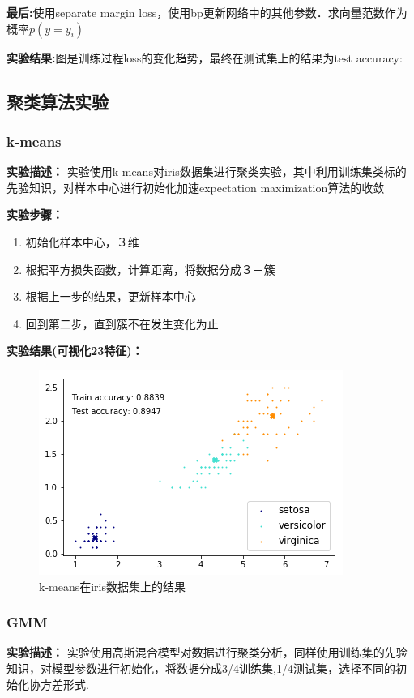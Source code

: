 \documentclass{article}
\begin{document}
\textbf{最后:}使用separate margin loss，使用bp更新网络中的其他参数．求向量范数作为概率$p(y=y_i)$

\textbf{实验结果:}图是训练过程loss的变化趋势，最终在测试集上的结果为test accuracy:

\subsection{聚类算法实验}
\subsubsection{k-means}
\textbf{实验描述：}
实验使用k-means对iris数据集进行聚类实验，其中利用训练集类标的先验知识，对样本中心进行初始化加速expectation maximization算法的收敛

\textbf{实验步骤：}
\begin{enumerate}
\item 初始化样本中心，３维
\item 根据平方损失函数，计算距离，将数据分成３－簇
\item 根据上一步的结果，更新样本中心
\item 回到第二步，直到簇不在发生变化为止 
\end{enumerate}

\textbf{实验结果(可视化23特征)：}
\begin{figure}[htb]
	\centering\includegraphics[scale=1.1]{knn_iris}
	\caption{k-means在iris数据集上的结果}
\end{figure}
\subsubsection{GMM}
\textbf{实验描述：}
实验使用高斯混合模型对数据进行聚类分析，同样使用训练集的先验知识，对模型参数进行初始化，将数据分成3/4训练集,1/4测试集，选择不同的初始化协方差形式.
\end{document}
